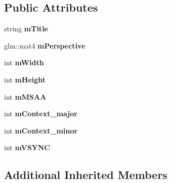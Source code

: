 \subsection*{Public Attributes}
\begin{DoxyCompactItemize}
\item 
\hypertarget{classEngine_1_1DisplayConfig_a2f9c108805bb090aa22b293199ad9f6a}{}string {\bfseries m\+Title}\label{classEngine_1_1DisplayConfig_a2f9c108805bb090aa22b293199ad9f6a}

\item 
\hypertarget{classEngine_1_1DisplayConfig_a13246eda30c6f050914c5ee8301eba8b}{}glm\+::mat4 {\bfseries m\+Perspective}\label{classEngine_1_1DisplayConfig_a13246eda30c6f050914c5ee8301eba8b}

\item 
\hypertarget{classEngine_1_1DisplayConfig_a3658be3a503df4de4215dd64af446a0c}{}int {\bfseries m\+Width}\label{classEngine_1_1DisplayConfig_a3658be3a503df4de4215dd64af446a0c}

\item 
\hypertarget{classEngine_1_1DisplayConfig_ae46440a8edd4c96839219927f61af515}{}int {\bfseries m\+Height}\label{classEngine_1_1DisplayConfig_ae46440a8edd4c96839219927f61af515}

\item 
\hypertarget{classEngine_1_1DisplayConfig_ad699df2a2aee0e6a56ac7860f8abc8cb}{}int {\bfseries m\+M\+S\+A\+A}\label{classEngine_1_1DisplayConfig_ad699df2a2aee0e6a56ac7860f8abc8cb}

\item 
\hypertarget{classEngine_1_1DisplayConfig_ad71c9629be0b5955cd69a2c05060de71}{}int {\bfseries m\+Context\+\_\+major}\label{classEngine_1_1DisplayConfig_ad71c9629be0b5955cd69a2c05060de71}

\item 
\hypertarget{classEngine_1_1DisplayConfig_ad17ce18665c07b8378267ff30f3496be}{}int {\bfseries m\+Context\+\_\+minor}\label{classEngine_1_1DisplayConfig_ad17ce18665c07b8378267ff30f3496be}

\item 
\hypertarget{classEngine_1_1DisplayConfig_a2d1cbd250b87d43fb169ae005c8ebafa}{}int {\bfseries m\+V\+S\+Y\+N\+C}\label{classEngine_1_1DisplayConfig_a2d1cbd250b87d43fb169ae005c8ebafa}

\end{DoxyCompactItemize}
\subsection*{Additional Inherited Members}


